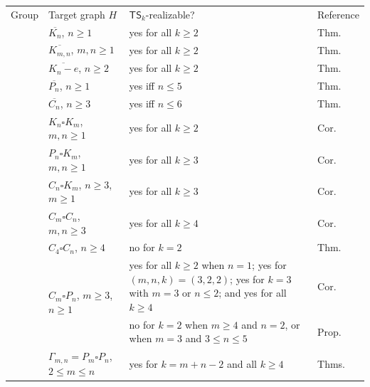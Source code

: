 \documentclass[a4paper]{article}
\theoremstyle{plain}
\theoremstyle{definition}
\newcommand{\TSsym}{\mathsf{TS}}
\numberwithin{equation}{section}
\newcommand{\TableGroupRule}{\specialrule{1.1pt}{0.45ex}{0.45ex}}
\begin{document}
\begin{table}[ht]
\centering
\renewcommand{\arraystretch}{1.18}
\begin{tabularx}{\textwidth}{@{}L{0.16\textwidth}L{0.24\textwidth}YL{0.20\textwidth}@{}}
\toprule
Group & Target graph $H$ & $\TSsym_k$-realizable? & Reference \\
\TableGroupRule
{}
& $\overline{K_n}$, $n\ge 1$ & yes for all $k\ge 2$ & Thm.~ \\
\cmidrule(lr){2-4}
& $\overline{K_{m,n}}$, $m,n\ge 1$ & yes for all $k\ge 2$ & Thm.~ \\
\cmidrule(lr){2-4}
& $\overline{K_n-e}$, $n\ge 2$ & yes for all $k\ge 2$ & Thm.~ \\
\cmidrule(lr){2-4}
& $\overline{P_n}$, $n\ge 1$ & yes iff $n\le 5$ & Thm.~ \\
\cmidrule(lr){2-4}
& $\overline{C_n}$, $n\ge 3$ & yes iff $n\le 6$ & Thm.~ \\
\TableGroupRule
{}
& $K_n\square K_m$, $m,n\ge 1$ & yes for all $k\ge 2$ & Cor.~ \\
\cmidrule(lr){2-4}
& $P_n\square K_m$, $m,n\ge 1$ & yes for all $k\ge 3$ & Cor.~ \\
\cmidrule(lr){2-4}
& $C_n\square K_m$, $n\ge 3$, $m\ge 1$ & yes for all $k\ge 3$ & Cor.~ \\
\cmidrule(lr){2-4}
& $C_m\square C_n$, $m,n\ge 3$ & yes for all $k\ge 4$ & Cor.~ \\
\cmidrule(lr){2-4}
& $C_4\square C_n$, $n\ge 4$ & no for $k=2$ & Thm.~ \\
\cmidrule(lr){2-4}
&  & yes for all $k\ge 2$ when $n=1$; yes for $(m,n,k)=(3,2,2)$; yes for $k=3$ with $m=3$ or $n\le 2$; and yes for all $k\ge 4$ & Cor.~ \\
\cmidrule(lr){3-4}
& & no for $k=2$ when $m\ge 4$ and $n=2$, or when $m=3$ and $3\le n\le 5$ & Prop.~ \\
\cmidrule(lr){2-4}
& $\Gamma_{m,n} = P_m \square P_n$, $2\le m\le n$ & yes for $k=m+n-2$ and all $k\ge 4$ & Thms.~ \\

\end{tabularx}
\end{table}
\end{document}
